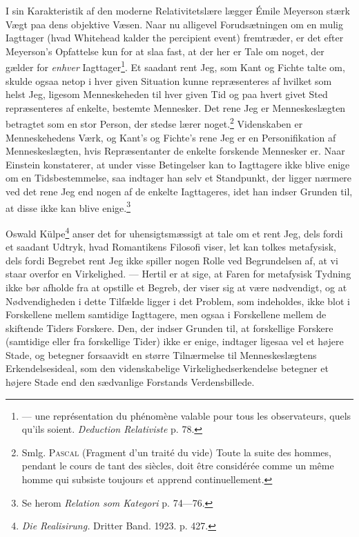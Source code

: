 \documentclass[12pt]{article}
\newcommand{\opage}[1]{\marginnote{\footnotesize\textit{[#1]}}}
\begin{document}
I sin Karakteristik af den moderne Relativitetslære lægger Émile
Meyerson stærk Vægt paa dens objektive Væsen. Naar nu alligevel
Forudsætningen om en mulig Iagttager (hvad Whitehead kalder the
percipient event) fremtræder, er det efter Meyerson's Opfattelse kun
for at slaa fast, at der her er Tale om noget, der gælder for
\emph{enhver} Iagttager\footnote{--- une représentation du phénomène
valable pour tous les observateurs, quels qu'ils soient.
\textit{Deduction Relativiste} p. 78.}. Et saadant rent Jeg, som Kant
og Fichte talte om, skulde ogsaa netop i hver given Situation kunne
repræsenteres af hvilket som helst Jeg, ligesom Menneskeheden til hver
given Tid og paa hvert givet Sted repræsenteres af enkelte, bestemte
Mennesker. Det rene Jeg er Menneskeslægten betragtet som en stor
Person, der stedse lærer noget.\footnote{Smlg. \textsc{Pascal}
(Fragment d'un traité du vide) Toute la suite des hommes, pendant le
cours de tant des siècles, doit être considérée comme un même homme
qui subsiste toujours et apprend continuellement.} Videnskaben er
Menneskehedens Værk, og
\setcounter{footnote}{0}%
\opage{19}Kant's og Fichte's rene Jeg er en Personifikation af
Menneskeslægten, hvis Repræsentanter de enkelte forskende Mennesker
er. Naar Einstein konstaterer, at under visse Betingelser kan to
Iagttagere ikke blive enige om en Tidsbestemmelse, saa indtager han
selv et Standpunkt, der ligger nærmere ved \guillemotright{}det rene Jeg\guillemotleft{} end nogen af
de enkelte Iagttageres, idet han indser Grunden til, at disse ikke kan
blive enige.\footnote{Se herom \textit{Relation som Kategori} p.
74---76.}

Oswald Külpe\footnote{\textit{Die Realisirung.} Dritter Band. 1923. p.
427.} anser det for uhensigtsmæssigt at tale om et rent Jeg, dels
fordi et saadant Udtryk, hvad Romantikens Filosofi viser, let kan
tolkes metafysisk, dels fordi Begrebet \guillemotright{}rent Jeg\guillemotleft{} ikke spiller nogen
Rolle ved Begrundelsen af, at vi staar overfor en Virkelighed. ---
Hertil er at sige, at Faren for metafysisk Tydning ikke bør afholde
fra at opstille et Begreb, der viser sig at være nødvendigt, og at
Nødvendigheden i dette Tilfælde ligger i det Problem, som indeholdes,
ikke blot i Forskellene mellem samtidige Iagttagere, men ogsaa i
Forskellene mellem de skiftende Tiders Forskere. Den, der indser
Grunden til, at forskellige Forskere (samtidige eller fra forskellige
Tider) ikke er enige, indtager ligesaa vel et højere Stade, og
betegner forsaavidt en større Tilnærmelse til Menneskeslægtens
Erkendelsesideal, som den videnskabelige Virkelighedserkendelse
betegner et højere Stade end den sædvanlige Forstands Verdensbillede.
\end{document}
